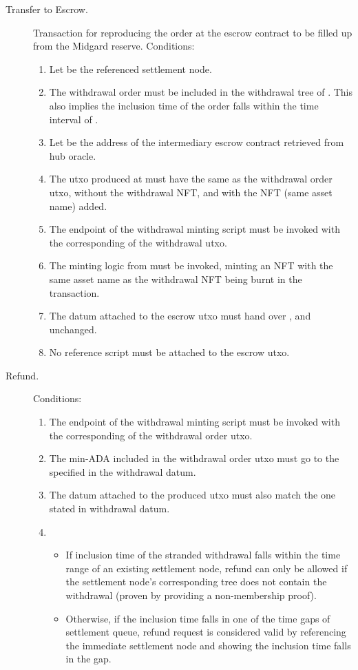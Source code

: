 \documentclass[../midgard.tex]{subfiles}
\begin{document}
\begin{description}
  \item[Transfer to Escrow.] Transaction for reproducing the order at the escrow contract to be filled up from the Midgard reserve.
    Conditions:
    \begin{enumerate}
      \item Let  be the referenced settlement node.
      \item The withdrawal order must be included in the withdrawal tree of .
        This also implies the inclusion time of the order falls within the time interval of .
      \item Let  be the address of the intermediary escrow contract retrieved from hub oracle.
      \item The utxo produced at  must have the same  as the withdrawal order utxo, without the withdrawal NFT, and with the  NFT (same asset name) added.
      \item The  endpoint of the withdrawal minting script must be invoked with the corresponding  of the withdrawal utxo.
      \item The minting logic from  must be invoked, minting an NFT with the same asset name as the withdrawal NFT being burnt in the transaction.
      \item The datum attached to the escrow utxo must hand over ,  and  unchanged.
      \item No reference script must be attached to the escrow utxo.
    \end{enumerate}
  \item[Refund.] 
    Conditions:
    \begin{enumerate}
      \item The  endpoint of the withdrawal minting script must be invoked with the corresponding  of the withdrawal order utxo.
      \item The min-ADA included in the withdrawal order utxo must go to the  specified in the withdrawal datum.
      \item The datum attached to the produced utxo must also match the one stated in withdrawal datum.
      \item 
        \begin{itemize}
          \item If inclusion time of the stranded withdrawal falls within the time range of an existing settlement node, refund can only be allowed if the settlement node's corresponding tree does not contain the withdrawal (proven by providing a non-membership proof).
          \item Otherwise, if the inclusion time falls in one of the time gaps of settlement queue, refund request is considered valid by referencing the immediate settlement node and showing the inclusion time falls in the gap.
        \end{itemize}
    \end{enumerate}
\end{description}
\end{document}
